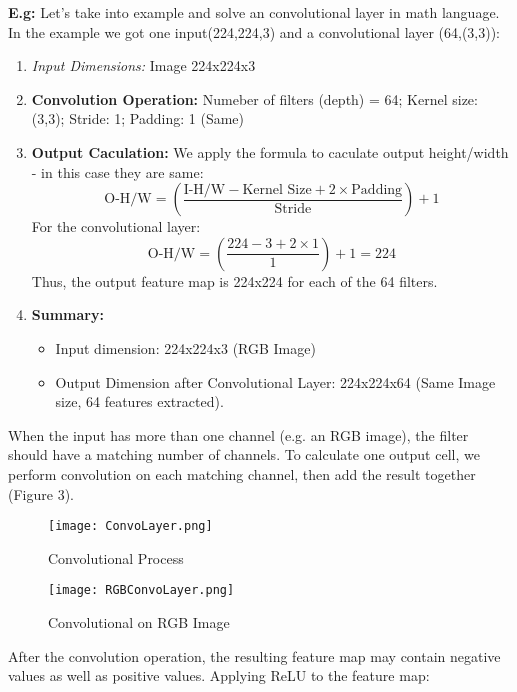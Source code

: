 \documentclass[12pt]{article}
\begin{document}
\begin{enumerate}
        \textbf{E.g:} Let's take into example and solve an convolutional layer in math language. In the example we got one input(224,224,3) and a convolutional layer (64,(3,3)):
        \begin{enumerate}
            \item \textit{Input Dimensions:} Image 224x224x3
            \item \textbf{Convolution Operation:} Numeber of filters (depth) = 64; Kernel size: (3,3); Stride: 1; Padding: 1 (Same)
            \item \textbf{Output Caculation:} We apply the formula to caculate output height/width - in this case they are same:
            \[\text{O-H/W} = \left( \frac{\text{I-H/W} - \text{Kernel Size} + 2 \times \text{Padding}}{\text{Stride}} \right) + 1\]
            For the convolutional layer:
            \[\text{O-H/W} = \left( \frac{224 - 3 + 2 \times 1}{1} \right) + 1  = 224\]
            Thus, the output feature map is 224x224 for each of the 64 filters.
            \item \textbf{Summary:}
            \begin{itemize}
                \item Input dimension: 224x224x3 (RGB Image)
                \item Output Dimension after Convolutional Layer: 224x224x64 (Same Image size, 64 features extracted).
            \end{itemize}
        \end{enumerate}

        When the input has more than one channel (e.g. an RGB image), the filter should have a matching number of channels. To calculate one output cell, we perform convolution on each matching channel, then add the result together (Figure 3).
        
        \begin{figure}[h]
        \centering
        \texttt{[image: ConvoLayer.png]}
        \caption{Convolutional Process}
        \label{fig:enter-label}
        \end{figure}

        \begin{figure}[h]
        \centering
        \texttt{[image: RGBConvoLayer.png]}
        \caption{Convolutional on RGB Image}
        \end{figure}

        After the convolution operation, the resulting feature map may contain negative values as well as positive values. Applying ReLU to the feature map:


\end{enumerate}
\end{document}
